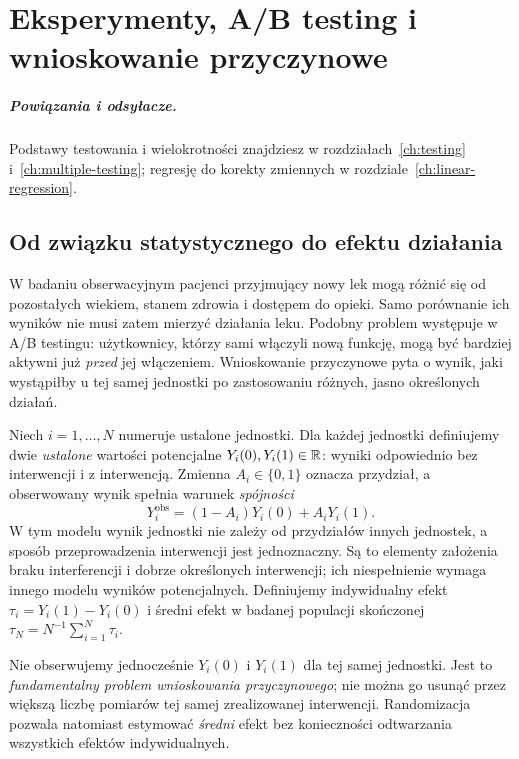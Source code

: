 \chapter{Eksperymenty, A/B testing i wnioskowanie przyczynowe}
\label{ch:causal-ab}
\paragraph{Powiązania i odsyłacze.} Podstawy testowania i wielokrotności znajdziesz w rozdziałach~\ref{ch:testing} i~\ref{ch:multiple-testing}; regresję do korekty zmiennych w rozdziale~\ref{ch:linear-regression}.


\section{Od związku statystycznego do efektu działania}
W badaniu obserwacyjnym pacjenci przyjmujący nowy lek mogą różnić się od pozostałych wiekiem, stanem zdrowia i dostępem do opieki. Samo porównanie ich wyników nie musi zatem mierzyć działania leku. Podobny problem występuje w A/B testingu: użytkownicy, którzy sami włączyli nową funkcję, mogą być bardziej aktywni już \emph{przed} jej włączeniem. Wnioskowanie przyczynowe pyta o wynik, jaki wystąpiłby u tej samej jednostki po zastosowaniu różnych, jasno określonych działań.

\begin{definicja}\label{def:potential-outcomes}
Niech $i=1,\ldots,N$ numeruje ustalone jednostki. Dla każdej jednostki definiujemy dwie \emph{ustalone} wartości potencjalne $Y_i(0),Y_i(1)\in\mathbb R$: wyniki odpowiednio bez interwencji i z interwencją. Zmienna $A_i\in\{0,1\}$ oznacza przydział, a obserwowany wynik spełnia warunek \emph{spójności}
\[
Y_i^{\mathrm{obs}}=(1-A_i)Y_i(0)+A_iY_i(1).
\]
W tym modelu wynik jednostki nie zależy od przydziałów innych jednostek, a sposób przeprowadzenia interwencji jest jednoznaczny. Są to elementy założenia braku interferencji i dobrze określonych interwencji; ich niespełnienie wymaga innego modelu wyników potencjalnych.
Definiujemy indywidualny efekt $\tau_i=Y_i(1)-Y_i(0)$ i średni efekt w badanej populacji skończonej $\tau_N=N^{-1}\sum_{i=1}^N\tau_i$.
\end{definicja}

Nie obserwujemy jednocześnie $Y_i(0)$ i $Y_i(1)$ dla tej samej jednostki. Jest to \emph{fundamentalny problem wnioskowania przyczynowego}; nie można go usunąć przez większą liczbę pomiarów tej samej zrealizowanej interwencji. Randomizacja pozwala natomiast estymować \emph{średni} efekt bez konieczności odtwarzania wszystkich efektów indywidualnych.

